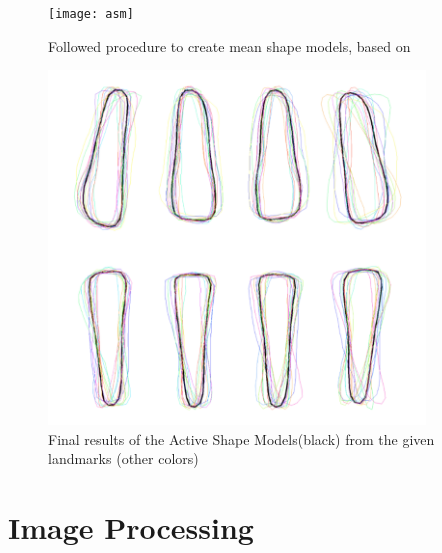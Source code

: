 \documentclass[a4paper]{article}
\begin{document}
\begin{figure}[h] 
    \centering
    \texttt{[image: asm]}
    \caption{Followed procedure to create mean shape models, based on \cite{cootes2}}
    \label{fig:procrustes}
\end{figure}


\begin{figure}[h] 
    \centering
    \includegraphics[width=10cm]{activeshapemodel}
    \caption{Final results of the Active Shape Models(black) from the given landmarks (other colors)}
    \label{fig:models}
\end{figure}

\section{Image Processing}\label{sec:preprocessing}
\end{document}
